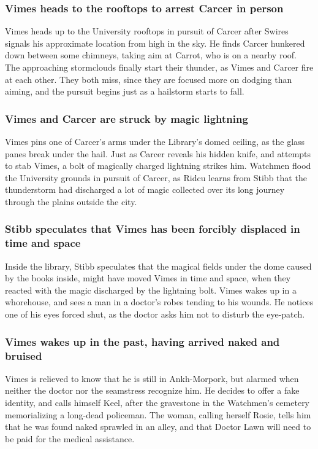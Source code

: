 \subsubsection{\Gls{Vimes} heads to the rooftops to arrest \Gls{Carcer} in person}
\Gls{Vimes} heads up to the University rooftops in pursuit of \Gls{Carcer} after \Gls{Swires}
signals his approximate location from high in the sky. He finds \Gls{Carcer} hunkered down between
some chimneys, taking aim at \Gls{Carrot}, who is on a nearby roof. The approaching stormclouds
finally start their thunder, as \Gls{Vimes} and \Gls{Carcer} fire at each other. They both miss,
since they are focused more on dodging than aiming, and the pursuit begins just as a hailstorm
starts to fall.

\subsubsection{\Gls{Vimes} and \Gls{Carcer} are struck by magic lightning}
\Gls{Vimes} pins one of \Gls{Carcer}'s arms under the Library's domed ceiling, as the glass panes
break under the hail. Just as \Gls{Carcer} reveals his hidden knife, and attempts to stab
\Gls{Vimes}, a bolt of magically charged lightning strikes him. Watchmen flood the University
grounds in pursuit of \Gls{Carcer}, as \Gls{Ridcu} learns from \Gls{Stibb} that the thunderstorm
had discharged a lot of magic collected over its long journey through the plains outside the city.

\subsubsection{\Gls{Stibb} speculates that \Gls{Vimes} has been forcibly displaced in time and
    space}
Inside the library, \Gls{Stibb} speculates that the magical fields under the dome caused by the
books inside, might have moved \Gls{Vimes} in time and space, when they reacted with the magic
discharged by the lightning bolt. \Gls{Vimes} wakes up in a whorehouse, and sees a man in a doctor's
robes tending to his wounds. He notices one of his eyes forced shut, as the doctor asks him not to
disturb the eye-patch.

\subsubsection{\Gls{Vimes} wakes up in the past, having arrived naked and bruised}
\Gls{Vimes} is relieved to know that he is still in Ankh-Morpork, but alarmed when neither the
doctor nor the seamstress recognize him. He decides to offer a fake identity, and calls himself
\Gls{Keel}, after the gravestone in the Watchmen's cemetery memorializing a long-dead policeman.
The woman, calling herself \Gls{Rosie}, tells him that he was found naked sprawled in an alley,
and that Doctor \Gls{Lawn} will need to be paid for the medical assistance.

